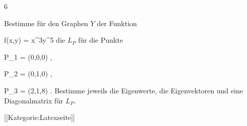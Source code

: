 {6}
{

Bestimme für den Graphen $Y$ der Funktion

\mavergleichskettedisp
{\vergleichskette
{ f(x,y)
}
{ =} { x^3y^5
}
{ } {
}
{ } {
}
{ } {
}
}
{}{}{}
die
$L_P$ für die Punkte

\mavergleichskette
{\vergleichskette
{ P_1
}
{ = }{ (0,0,0)
}
{  }{
}
{    }{
}
{   }{
}
}
{}{}{,}

\mavergleichskette
{\vergleichskette
{ P_2
}
{ = }{ (0,1,0)
}
{  }{
}
{    }{
}
{   }{
}
}
{}{}{,}

\mavergleichskette
{\vergleichskette
{ P_3
}
{ = }{ (2,1,8)
}
{  }{
}
{    }{
}
{   }{
}
}
{}{}{.}
Bestimme jeweils die Eigenwerte, die Eigenvektoren und eine Diagonalmatrix für $L_P$.

}
{} {}

 [[Kategorie:Latexseite]]
